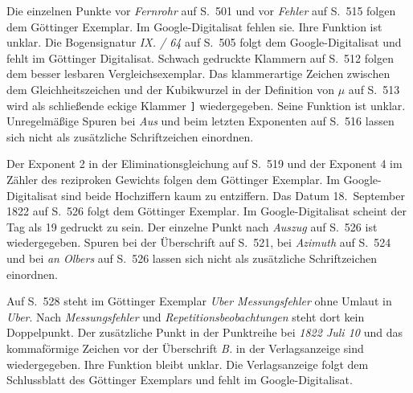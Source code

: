Die einzelnen Punkte vor \emph{Fernrohr} auf S.~501 und vor
\emph{Fehler} auf S.~515 folgen dem Göttinger Exemplar. Im
Google-Digitalisat fehlen sie. Ihre Funktion ist unklar. Die
Bogensignatur \emph{IX. / 64} auf S.~505 folgt dem Google-Digitalisat
und fehlt im Göttinger Digitalisat. Schwach gedruckte Klammern auf
S.~512 folgen dem besser lesbaren Vergleichsexemplar. Das
klammerartige Zeichen zwischen dem Gleichheitszeichen und der
Kubikwurzel in der Definition von \(\mu\) auf S.~513 wird als
schließende eckige Klammer \texttt{]} wiedergegeben. Seine Funktion ist
unklar. Unregelmäßige Spuren bei \emph{Aus} und beim letzten
Exponenten auf S.~516 lassen sich nicht als zusätzliche
Schriftzeichen einordnen.

Der Exponent 2 in der Eliminationsgleichung auf S.~519 und der
Exponent 4 im Zähler des reziproken Gewichts folgen dem Göttinger
Exemplar. Im Google-Digitalisat sind beide Hochziffern kaum zu
entziffern. Das Datum 18.~September 1822 auf S.~526 folgt
dem Göttinger Exemplar. Im Google-Digitalisat scheint der Tag als
19 gedruckt zu sein. Der einzelne Punkt nach \emph{Auszug} auf
S.~526 ist wiedergegeben. Spuren bei der Überschrift auf S.~521,
bei \emph{Azimuth} auf S.~524 und bei \emph{an Olbers} auf S.~526
lassen sich nicht als zusätzliche Schriftzeichen einordnen.

Auf S.~528 steht im Göttinger Exemplar \emph{Uber Messungsfehler} ohne Umlaut in \emph{Uber}. Nach \emph{Messungsfehler} und \emph{Repetitionsbeobachtungen} steht dort kein Doppelpunkt. Der zusätzliche Punkt in der Punktreihe bei
\emph{1822 Juli 10} und das kommaförmige Zeichen vor der
Überschrift \emph{B.} in der Verlagsanzeige sind wiedergegeben.
Ihre Funktion bleibt unklar. Die Verlagsanzeige folgt dem
Schlussblatt des Göttinger Exemplars und fehlt im Google-Digitalisat.
